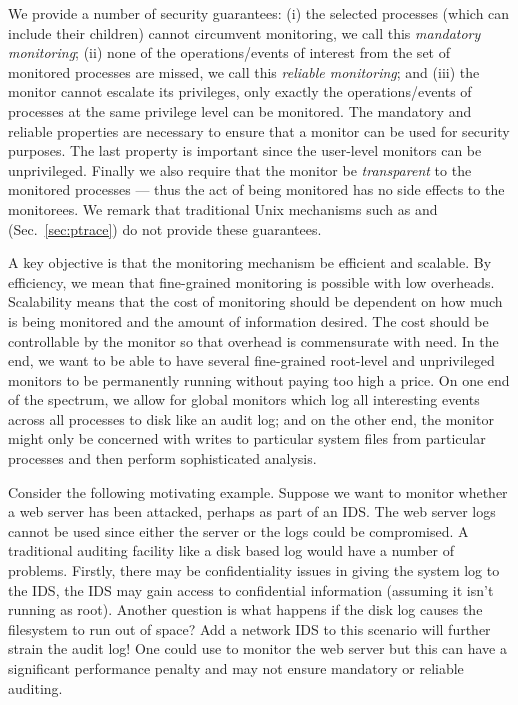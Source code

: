 We provide a number of security guarantees:
(i) the selected processes (which can include their children)
cannot circumvent monitoring, we call this {\em mandatory monitoring};
(ii) none of the operations/events of interest from the set of monitored
processes are missed, we call this {\em reliable monitoring};
and 
(iii) the monitor cannot escalate its privileges, only exactly
the operations/events of processes at the same privilege level can
be monitored.
The mandatory and reliable properties are necessary to ensure that a monitor
can be used for security purposes.
The last property is important since the user-level monitors can be 
unprivileged.
Finally we also require that the monitor be {\em transparent} to the monitored
processes --- thus the act of being monitored has no side effects to the
monitorees.
We remark that traditional Unix mechanisms such as  and 
 (Sec.~\ref{sec:ptrace}) do not provide these guarantees.

A key objective is that the monitoring mechanism be efficient and scalable.
By efficiency, we mean that fine-grained monitoring is possible with low
overheads.
Scalability means that the cost of monitoring should be dependent on
how much is being monitored and the amount of information desired.
The cost should be controllable by the monitor so that overhead is
commensurate with need.
In the end, we want to be able to have several fine-grained root-level and 
unprivileged monitors to be permanently running without 
paying too high a price. 
On one end of the spectrum, we allow for global monitors which
log all interesting events across all processes to disk like 
an audit log; and on the other end, the monitor might only be concerned
with writes to particular system files from particular processes
and then perform sophisticated analysis.

Consider the following motivating example.
Suppose we want to monitor whether a web server has been attacked,
perhaps as part of an IDS.
The web server logs cannot be used since either
the server or the logs could be compromised. 
A traditional auditing facility like a disk based log would 
have a number of problems. Firstly, there may be confidentiality
issues in giving the system log to the IDS, the IDS may gain access to
confidential information (assuming it isn't running as root).
Another question is what happens if the disk log 
causes the filesystem to run out of space?
Add a network IDS to this scenario will further strain the audit log!
One could use  to monitor the web server 
but this can have a significant performance penalty and may
not ensure mandatory or reliable auditing.

